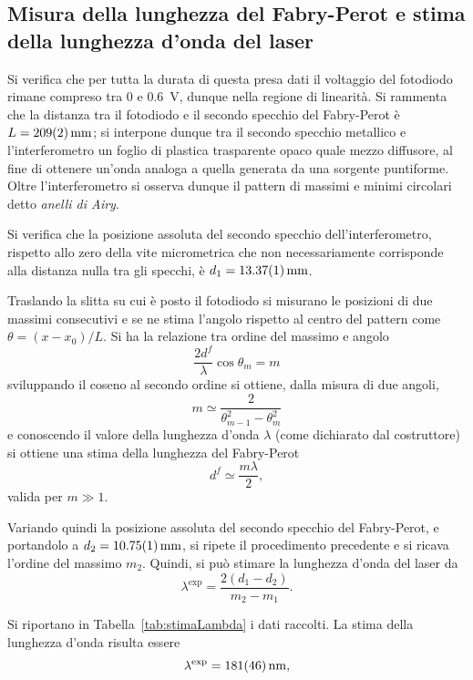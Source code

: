 \documentclass[10pt,oneside,a4paper]{article}
\begin{document}
\begin{multicols}{2}
\section{Misura della lunghezza del Fabry-Perot e stima della lunghezza d'onda del laser}
Si verifica che per tutta la durata di questa presa dati il voltaggio del fotodiodo rimane compreso tra \SI{0}{} e \SI{0.6}{V}, dunque nella regione di linearità. Si rammenta che la distanza tra il fotodiodo e il secondo specchio del Fabry-Perot è $L=\SI{209 \pm 2}{mm}$; si interpone dunque tra il secondo specchio metallico e l'interferometro un foglio di plastica trasparente opaco quale mezzo diffusore, al fine di ottenere un'onda analoga a quella generata da una sorgente puntiforme. Oltre l'interferometro si osserva dunque il pattern di massimi e minimi circolari detto \emph{anelli di Airy}.

Si verifica che la posizione assoluta del secondo specchio dell'interferometro, rispetto allo zero della vite micrometrica che non necessariamente corrisponde alla distanza nulla tra gli specchi, è $d_1 = \SI{13.37 \pm 0.01}{mm}$.

Traslando la slitta su cui è posto il fotodiodo si misurano le posizioni di due massimi consecutivi e se ne stima l'angolo rispetto al centro del pattern come $\theta = (x-x_0) / L$. Si ha la relazione tra ordine del massimo e angolo 
\begin{equation}\label{eq:diff}
\frac{2d^f}{\lambda} \cos{\theta_m} = m
\end{equation}
sviluppando il coseno al secondo ordine si ottiene, dalla misura di due angoli,
\[
m \simeq \frac{2}{\theta_{m-1}^2 - \theta_{m}^2}
\]
e conoscendo il valore della lunghezza d'onda $\lambda$ (come dichiarato dal costruttore) si ottiene una stima della lunghezza del Fabry-Perot
\[
d^f \simeq \frac{m \lambda}{2},
\]
valida per $m \gg 1$.

Variando quindi la posizione assoluta del secondo specchio del Fabry-Perot, e portandolo a $d_2 = \SI{10.75 \pm 0.01}{mm}$, si ripete il procedimento precedente e si ricava l'ordine del massimo $m_2$. Quindi, si può stimare la lunghezza d'onda del laser da \[
\lambda^{\text{exp}} = \frac{2(d_1 - d_2)}{m_2 - m_1}.
\]

Si riportano in Tabella~\ref{tab:stimaLambda} i dati raccolti. La stima della lunghezza d'onda risulta essere
\[
\lambda^{\text{exp}} = \SI{ 181 \pm 46}{nm},
\]


\end{multicols}
\end{document}
